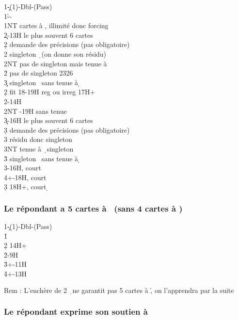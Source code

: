 \documentclass[a4paper]{article}
\begin{document}
\begin{bidtable}
1\c-(1\d)-Dbl-(Pass)\\
1\h--\\
1NT  cartes à \s , illimité donc forcing\+\\
2\c {}-13H le plus souvent 6 cartes\+\\
2\d \> demande des précisions (pas obligatoire)\+\\
2\s \> singleton \d\ (on donne son résidu)\\
2NT \> pas de singleton mais tenue à \d \\
2\h \> pas de singleton 2326\\
3\c \> singleton \s\ sans tenue à \d \-\-\\
2\d \> fit 18-19H reg ou irreg 17H+\\
2\s {}-14H\\
2NT -19H sans tenue\\
3\c {}-16H le plus souvent 6 cartes\+\\
3\d \> demande des précisions (pas obligatoire)\+\\
3\s \> résidu donc singleton \d \\
3NT \> tenue à \d\ singleton \s \\
3\h \> singleton \s\ sans tenue à \d \-\-\\
3\s {}-16H, court \d \\
4\s {}+-18H, court \d \\
3\d \> 18H+, court \d \-
\end{bidtable}

\subsubsection{Le répondant a 5 cartes à \pdfh\ (sans 4 cartes à \pdfs)}

\begin{bidtable}
1\c-(1\d)-Dbl-(Pass)\\
1\h\+\\
2\d \> 14H+\\
2\h {}-9H\\
3\h {}+-11H\\
4\h {}+-13H\-
\end{bidtable}

Rem : L’enchère de 2 \d\ ne garantit pas 5 cartes à \h , on l’apprendra par la suite

\subsubsection{Le répondant exprime son soutien à \pdfc}
\end{document}
